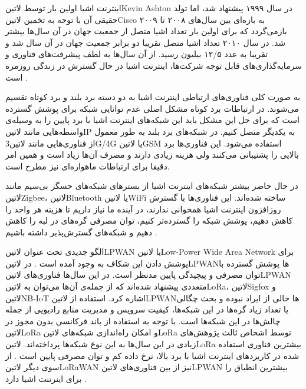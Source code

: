 
اینترنت اشیا اولین بار توسط ‌لاتین{Kevin Ashton} در سال ۱۹۹۹ پیشنهاد شد، اما تولد حقیقی آن
با توجه به تخمین ‌لاتین{Cisco} به بازه‌ای بین سال‌های ۲۰۰۸ تا ۲۰۰۹ بازمی‌گردد که برای اولین بار تعداد اشیا
متصل از جمعیت جهان در آن سال‌ها بیشتر شد. در سال ۲۰۱۰ تعداد اشیا متصل تقریبا دو برابر جمعیت جهان در آن سال شد و تقریبا به عدد ۱۲/۵ بیلیون رسید.
از آن سال‌ها به لطف پیشرفت‌های فناوری و سرمایه‌گذاری‌های قابل توجه شرکت‌ها، اینترنت اشیا در حال گسترش در زندگی روزمره است
.

به صورت کلی فناوری‌های ارتباطی اینترنت اشیا به دو دسته برد بلند و برد کوتاه تقسیم می‌شوند. در ارتباطات برد کوتاه مشکل اصلی عدم توانایی شبکه برای پوشش گسترده است
که برای حل این مشکل باید این شبکه‌های اینترنت اشیا با برد پایین را به وسیله‌ی واسطه‌هایی مانند ‌لاتین{IP} به یکدیگر متصل کنیم.
در شبکه‌های برد بلند به طور معمول از فناوری‌هایی مانند ‌لاتین{3G/4G} یا ‌لاتین{GSM} استفاده می‌شود.
این فناوری‌ها برد بالایی را پشتیبانی می‌کنند ولی هزینه زیادی دارند و مصرف آن‌ها زیاد است و همین امر دقیقا برای ارتباطات ماهواره‌ای نیز مطرح است.

در حال حاضر بیشتر شبکه‌های اینترنت اشیا از بسترهای شبکه‌های حسگر بی‌سیم مانند ‌لاتین{Zigbee}، ‌لاتین{Bluetooth} یا ‌لاتین{WiFi} ساخته شده‌اند.
این فناوری‌ها با گسترش روزافزون اینترنت اشیا همخوانی ندارند، در آینده ما نیاز داریم تا هزینه هر واحد را کاهش دهیم،
پوشش شبکه را گسترده‌تر کنیم، توان مصرفی گره‌های در لبه را کاهش دهیم و شبکه‌های گسترش‌پذیر داشته باشیم .

الگو جدیدی تحت عنوان ‌لاتین{LPWAN} یا ‌لاتین{Low-Power Wide Area Network} برای پوشش دادن این شکاف به وجود آمده است .
در ‌لاتین{LPWAN}ها پوشش گسترده با توان مصرفی و پیچیدگی پایین مدنظر است.
در این سال‌ها فناوری‌های ‌لاتین{LPWAN} متعددی پیشنهاد شده‌اند که از جمله‌ی آن‌ها می‌توان به ‌لاتین{LoRa}، ‌لاتین{Sigfox} و ‌لاتین{NB-IoT} اشاره کرد.
استفاده از ‌لاتین{LPWAN}ها خالی از ایراد نبوده و بحث چگالی یا تعداد زیاد گره‌ها در این شبکه‌ها، کیفیت سرویس و مدیریت منابع رادیویی
از جمله چالش‌ها در این شبکه‌ها است.
با توجه به استفاده از باند فرکانسی بدون مجوز در ‌لاتین{LoRa} و امکان راه‌اندازی شبکه‌های ‌لاتین{LoRa} توسط اشخاص ثالث پژوهش‌های زیادی در این سال‌ها به این نوع شبکه‌ها پرداخته‌اند.
‌لاتین{LoRa} بیشترین فناوری استفاده شده در کاربردهای اینترنت اشیا با برد بالا، نرخ داده کم و توان مصرفی پایین است .
از سوی دیگر ‌لاتین{LoRaWAN} نیز از بین فناوری‌های ‌لاتین{LPWAN} بیشترین انطباق را برای اینرتنت اشیا دارد .

